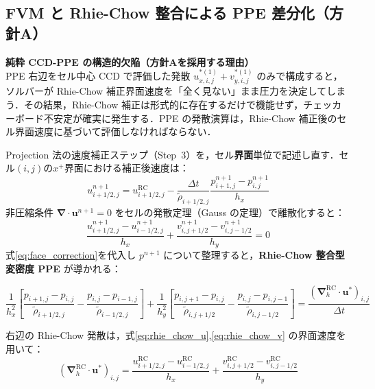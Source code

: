 \documentclass[12pt, a4paper, titlepage]{article}
\newcommand{\jp}[1]{{\normalfont\jpfont #1}}
\newcommand{\bu}{\bm{u}}
\newcommand{\bnabla}{\bm{\nabla}}
\begin{document}
\subsection{\jp{FVM と Rhie-Chow 整合による PPE 差分化（方針A）}}
\label{sec:PPE_FVM}

\begin{tcolorbox}[warnbox]
\textbf{\jp{純粋 CCD-PPE の構造的欠陥（方針Aを採用する理由）}}\\
\jp{PPE 右辺をセル中心 CCD で評価した発散 $u^{*(1)}_{x,i,j}+v^{*(1)}_{y,i,j}$ のみで構成すると，ソルバーが Rhie-Chow 補正界面速度を「全く見ない」まま圧力を決定してしまう．その結果，Rhie-Chow 補正は形式的に存在するだけで機能せず，チェッカーボード不安定が確実に発生する．PPE の発散演算は，Rhie-Chow 補正後のセル界面速度に基づいて評価しなければならない．}
\end{tcolorbox}

\jp{Projection 法の速度補正ステップ（Step~3）を，セル\textbf{界面}単位で記述し直す．セル$(i,j)$の$x^+$界面における補正後速度は：}
\begin{equation}
  u^{n+1}_{i+1/2,j} = u^{\mathrm{RC}}_{i+1/2,j}
    - \frac{\Delta t}{\tilde\rho_{i+1/2,j}}\frac{p^{n+1}_{i+1,j}-p^{n+1}_{i,j}}{h_x}
  \label{eq:face_correction}
\end{equation}
\jp{非圧縮条件 $\bnabla\!\cdot\!\bu^{n+1}=0$ をセルの発散定理（Gauss の定理）で離散化すると：}
\begin{equation}
  \frac{u^{n+1}_{i+1/2,j}-u^{n+1}_{i-1/2,j}}{h_x}
  + \frac{v^{n+1}_{i,j+1/2}-v^{n+1}_{i,j-1/2}}{h_y} = 0
\end{equation}
\jp{式\eqref{eq:face_correction}を代入し $p^{n+1}$ について整理すると，\textbf{Rhie-Chow 整合型変密度 PPE} が導かれる：}

\begin{tcolorbox}[mybox, title={\jp{FVM 変密度 PPE（Rhie-Chow 整合，2次元）}}]
\begin{equation}
  \frac{1}{h_x^2}\!\left[
    \frac{p_{i+1,j}-p_{i,j}}{\tilde\rho_{i+1/2,j}}
  - \frac{p_{i,j}-p_{i-1,j}}{\tilde\rho_{i-1/2,j}}
  \right]
  + \frac{1}{h_y^2}\!\left[
    \frac{p_{i,j+1}-p_{i,j}}{\tilde\rho_{i,j+1/2}}
  - \frac{p_{i,j}-p_{i,j-1}}{\tilde\rho_{i,j-1/2}}
  \right]
  = \frac{(\bnabla_h^{\mathrm{RC}}\!\cdot\bu^*)_{i,j}}{\Delta t}
  \label{eq:PPE_FVM}
\end{equation}
\end{tcolorbox}

\jp{右辺の Rhie-Chow 発散は，式\eqref{eq:rhie_chow_u},\eqref{eq:rhie_chow_v} の界面速度を用いて：}
\begin{equation}
  (\bnabla_h^{\mathrm{RC}}\!\cdot\bu^*)_{i,j}
  = \frac{u^{\mathrm{RC}}_{i+1/2,j} - u^{\mathrm{RC}}_{i-1/2,j}}{h_x}
  + \frac{v^{\mathrm{RC}}_{i,j+1/2} - v^{\mathrm{RC}}_{i,j-1/2}}{h_y}
  \label{eq:RC_div}
\end{equation}
\end{document}
